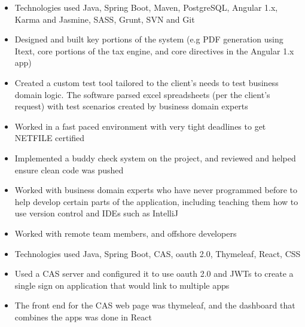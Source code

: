 \begin{cventries}
{{\begin{cvitems}
{                    }
                    \item[] {
                        \begin{itemize}
                            \item {Technologies used Java, Spring Boot, Maven, PostgreSQL, Angular 1.x, Karma and Jasmine, SASS, Grunt, SVN and Git}
                            \item {Designed and built key portions of the system (e.g PDF generation using Itext, core portions of the tax engine, and core directives in the Angular 1.x app)}
                            \item {Created a custom test tool tailored to the client’s needs to test business domain logic. The software parsed excel spreadsheets
                                    (per the client’s request) with test scenarios created by business domain experts}
                            \item {Worked in a fast paced environment with very tight deadlines to get NETFILE certified}
                            \item {Implemented a buddy check system on the project, and reviewed and helped ensure clean code was pushed}
                            \item {Worked with business domain experts who have never programmed before to help develop certain parts of the application, including teaching them how to use version control and IDEs such as IntelliJ}
                            \item {Worked with remote team members, and offshore developers}
                        \end{itemize}
                    }
                    \item[] {
                        \begin{itemize}
                            \item {Technologies used Java, Spring Boot, CAS, oauth 2.0, Thymeleaf, React, CSS}
                            \item {Used a CAS server and configured it to use oauth 2.0 and JWTs to create a single sign on application that would link to multiple apps}
                            \item {The front end for the CAS web page was thymeleaf, and the dashboard that combines the apps was done in React}
                        \end{itemize}
}
\end{cvitems}}}
\end{cventries}
